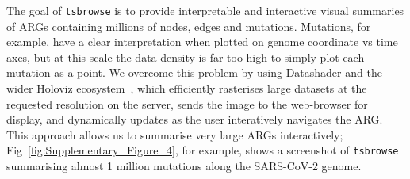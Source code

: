\documentclass[unnumsec,webpdf,contemporary,large,namedate]{oup-authoring-template}%
\begin{document}
The goal of \texttt{tsbrowse} is to provide interpretable
and interactive visual summaries of ARGs containing millions of nodes, edges 
and mutations. Mutations, for example, have a clear interpretation
when plotted on genome coordinate vs time axes, but at this scale 
the data density is far too high to simply plot each mutation as a point.
We overcome this problem by using Datashader and the wider 
Holoviz ecosystem~\citep{Holoviz}, which efficiently rasterises large datasets
at the requested resolution on the server, sends the image to the web-browser
for display, and dynamically updates as the user interatively navigates the ARG.
This approach allows us to summarise very large ARGs interactively;
Fig~\ref{fig:Supplementary_Figure_4}, for example, shows a screenshot of 
\texttt{tsbrowse} summarising almost 1 million mutations along the SARS-CoV-2
genome.


\end{document}
